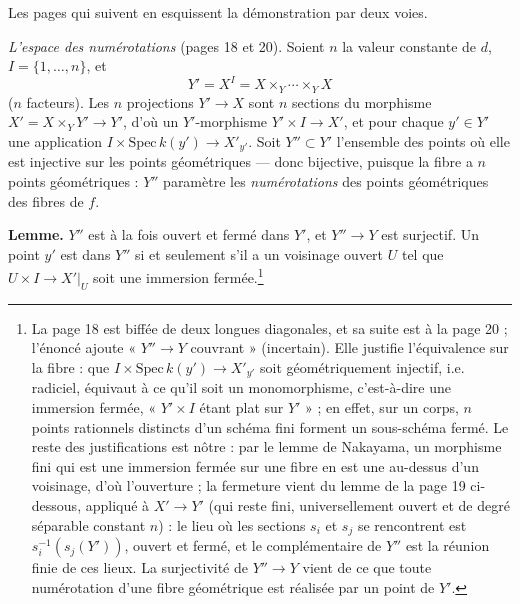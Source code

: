 \documentclass[11pt,a4paper]{article}
\begin{document}
Les pages qui suivent en esquissent la démonstration par deux voies.

\emph{L'espace des numérotations} (pages 18 et 20). Soient $n$ la valeur
constante de $d$, $I = \{1, \ldots, n\}$, et
\[
  Y' = X^{I} = X \times_Y \cdots \times_Y X
\]
($n$ facteurs). Les $n$ projections $Y' \to X$ sont $n$ sections du
morphisme $X' = X \times_Y Y' \to Y'$, d'où un $Y'$-morphisme $Y' \times I \to
X'$, et pour chaque $y' \in Y'$ une application $I \times \mathrm{Spec}\,
k(y') \to X'_{y'}$. Soit $Y'' \subset Y'$ l'ensemble des points où elle est
injective sur les points géométriques — donc bijective, puisque la fibre a
$n$ points géométriques : $Y''$ paramètre les \emph{numérotations} des points
géométriques des fibres de $f$.

\textbf{Lemme.} $Y''$ est à la fois ouvert et fermé dans $Y'$, et $Y'' \to Y$
est surjectif. Un point $y'$ est dans $Y''$ si et seulement s'il a un
voisinage ouvert $U$ tel que $U \times I \to X'|_U$ soit une immersion
fermée.\footnote{La page 18 est biffée de deux longues diagonales, et sa suite
est à la page 20 ; l'énoncé ajoute « $Y'' \to Y$ couvrant » (incertain). Elle
justifie l'équivalence sur la fibre : que $I \times \mathrm{Spec}\,k(y') \to
X'_{y'}$ soit géométriquement injectif, i.e. radiciel, équivaut à ce qu'il soit
un monomorphisme, c'est-à-dire une immersion fermée, « $Y' \times I$ étant
plat sur $Y'$ » ; en effet, sur un corps, $n$ points rationnels distincts d'un
schéma fini forment un sous-schéma fermé. Le reste des justifications est
nôtre : par le lemme de Nakayama, un morphisme fini qui est une immersion
fermée sur une fibre en est une au-dessus d'un voisinage, d'où l'ouverture ;
la fermeture vient du lemme de la page 19 ci-dessous, appliqué à $X' \to Y'$
(qui reste fini, universellement ouvert et de degré séparable constant $n$) :
le lieu où les sections $s_i$ et $s_j$ se rencontrent est
$s_i^{-1}(s_j(Y'))$, ouvert et fermé, et le complémentaire de $Y''$ est la
réunion finie de ces lieux. La surjectivité de $Y'' \to Y$ vient de ce que
toute numérotation d'une fibre géométrique est réalisée par un point de
$Y'$.}
\end{document}
